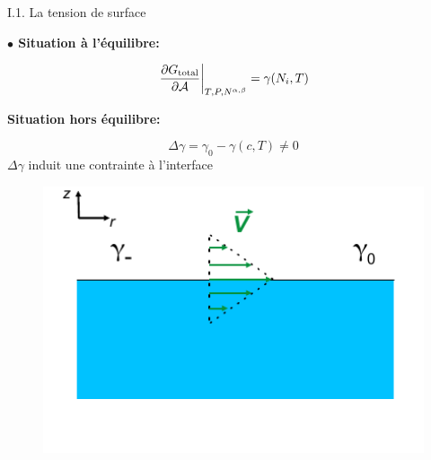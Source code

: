 \documentclass[aspectratio=169,10pt]{beamer}
\begin{document}
  \begin{frame}{I.1. La tension de surface}
    \begin{minipage}{6cm}
      \noindent \textbf{$\bullet$ Situation à l'équilibre:}
    \begin{figure}
     \centering
     \resizebox{.9\textwidth}{!}{}
   \end{figure}
   \begin{equation}
   \left.\frac{\partial G_{\rm total}}{\partial \mathcal{A}}\right|_{T,P,N^{\alpha, \beta}} = \gamma(N_i, T)
   \end{equation}
    \end{minipage}\hfill
    \begin{minipage}{6cm}
    \textbf{Situation hors équilibre:}
    \begin{ombredef}
      \begin{defi}
    \[\Delta \gamma = \gamma_0-\gamma(c,T)\neq 0\]
    $\Delta\gamma$ induit une contrainte à l'interface
      \end{defi}
    \end{ombredef}

      \begin{figure}
        \includegraphics[width=1\textwidth]{./figures/contrainte.pdf}
      \end{figure}
    \end{minipage}
  \end{frame}
\end{document}
